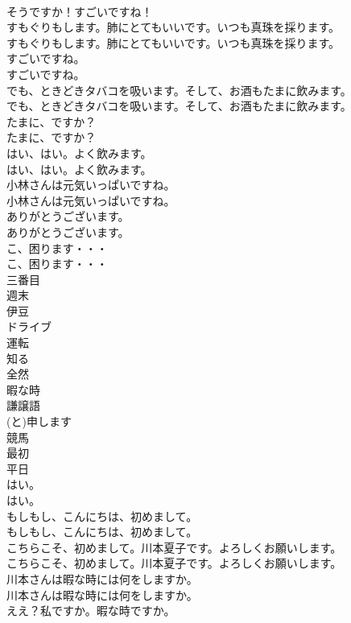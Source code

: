 \documentclass[8pt]{extreport}
\begin{document}
\begin{CJK}{UTF8}{min}
\\	そうですか！すごいですね！ 
\\	すもぐりもします。肺にとてもいいです。いつも真珠を採ります。	
\\	すもぐりもします。肺にとてもいいです。いつも真珠を採ります。 
\\	すごいですね。	
\\	すごいですね。 
\\	でも、ときどきタバコを吸います。そして、お酒もたまに飲みます。	
\\	でも、ときどきタバコを吸います。そして、お酒もたまに飲みます。 
\\	たまに、ですか？	
\\	たまに、ですか？ 
\\	はい、はい。よく飲みます。	
\\	はい、はい。よく飲みます。 
\\	小林さんは元気いっぱいですね。	
\\	小林さんは元気いっぱいですね。 
\\	ありがとうございます。	
\\	ありがとうございます。 
\\	こ、困ります・・・	
\\	こ、困ります・・・ 
\\	三番目
\\	週末
\\	伊豆
\\	ドライブ
\\	運転
\\	知る
\\	全然
\\	暇な時
\\	謙譲語
\\	(と)申します
\\	競馬
\\	最初
\\	平日
\\	はい。	
\\	はい。 
\\	もしもし、こんにちは、初めまして。	
\\	もしもし、こんにちは、初めまして。 
\\	こちらこそ、初めまして。川本夏子です。よろしくお願いします。	
\\	こちらこそ、初めまして。川本夏子です。よろしくお願いします。 
\\	川本さんは暇な時には何をしますか。	
\\	川本さんは暇な時には何をしますか。 
\\	ええ？私ですか。暇な時ですか。	

\end{CJK}
\end{document}
